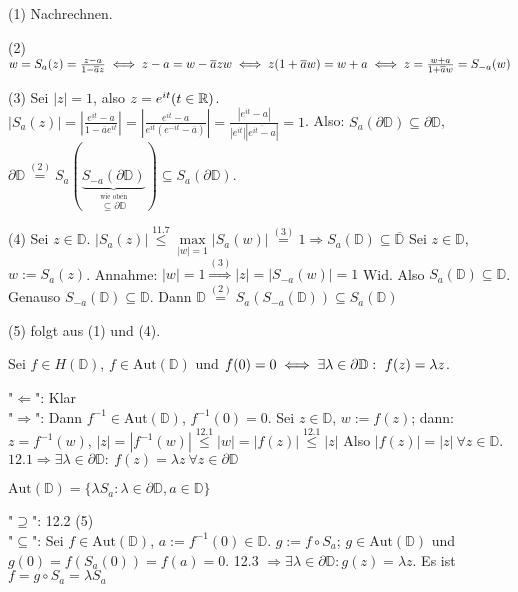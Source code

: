 \documentclass[a4paper,twoside,DIV15,BCOR12mm]{scrbook}
\def\gdw{\equizu}
\def\MdD{\mathbb{D}}
\def\gdw{\equizu}
\begin{document}
\begin{beweis}
\begin{liste}
\item[(1)] Nachrechnen.
\item[(2)] $w = S_a(z) = \frac{z-a}{1-\overline{a}z} \gdw z-a = w - \overline{a}zw \gdw z(1+\overline{a}w) = w+a \gdw z = \frac{w+a}{1+\overline{a}w} = S_{-a}(w)$
\item[(3)] Sei $|z| = 1$, also $z=e^{it} (t\in\mathbb{R})$.$|S_a(z)| = |\frac{e^{it} - a}{1-\overline{a}e^{it}}| = |\frac{e^{it} -a}{e^{it}(e^{-it}-\overline{a})}| = \frac{|e^{it} -a|}{|e^{it}||\overline{e^{it}-a}|} = 1$. Also: $S_a(\partial \MdD) \subseteq \partial \MdD$, $\partial \MdD \stackrel{(2)}{=} S_a( \underbrace{S_{-a}(\partial \MdD)}_{\stackrel{\text{wie oben}}{\subseteq \partial \MdD}} ) \subseteq S_a(\partial \MdD)$.
\item[(4)] Sei $z \in \MdD$. $|S_a(z)| \stackrel{\text{11.7}}{\leq} \max\limits_{|w|=1}|S_a(w)| \stackrel{(3)}{=} 1 \Rightarrow S_a(\MdD) \subseteq \overline{\MdD}$
Sei $z \in \MdD$, $w:=S_a(z)$. Annahme: $|w|=1 \stackrel{(3)}{\Rightarrow} |z| = |S_{-a}(w)| = 1$ Wid.
Also $S_a(\MdD) \subseteq \MdD$. Genauso $S_{-a}(\MdD) \subseteq \MdD$. Dann $\MdD \stackrel{(2)}{=} S_a(S_{-a}(\MdD)) \subseteq S_a(\MdD)$
\item[(5)] folgt aus (1) und (4).
\end{liste}
\end{beweis}

\begin {satz}
 Sei $f \in H(\MdD)$, $f \in \mbox{Aut}(\MdD)$ und $f(0)=0 \equizu \exists \lambda \in \partial \MdD:\ f(z) = \lambda z$.
\end{satz}
\begin{beweis}
  "$\Leftarrow$": Klar \\
  "$\Rightarrow$": Dann $f^{-1} \in \mbox{Aut}(\MdD)$, $f^{-1}(0) = 0$. Sei $z \in \MdD$, $w := f(z)$; dann: \\
   $z = f^{-1}(w)$, $|z| = |f^{-1}(w)| \stackrel{12.1}{\leq} |w| = |f(z)|\stackrel{12.1}{\leq} |z|$ Also 
   $|f(z)| = |z|\  \forall z \in \MdD$. $12.1 \Rightarrow \exists \lambda \in \partial \MdD:\ f(z) = \lambda z\ \forall z \in \partial \MdD$
\end{beweis}

\begin{satz}
 $\mbox{Aut}(\MdD) = \{ \lambda S_a: \lambda \in \partial \MdD, a \in \MdD\}$
\end{satz}
\begin{beweis}
 "$\supseteq$": 12.2 (5)\\
 "$\subseteq$": Sei $f \in \mbox{Aut}(\MdD)$, $a := f^{-1}(0) \in \MdD$. 
 $g := f \circ S_a$; $g \in \mbox{Aut}(\MdD)$ und $g(0) = f(S_a(0)) = f(a) = 0$. 
 12.3 $\Rightarrow \exists \lambda \in \partial \MdD: g(z) = \lambda z$. Es ist $f = g \circ S_a = \lambda S_a$
\end{beweis}
\end{document}
